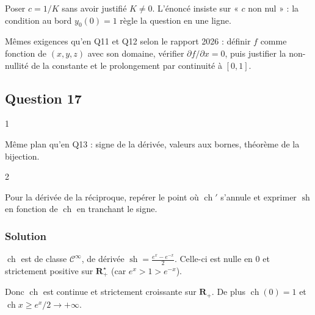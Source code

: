 \documentclass[11pt,a4paper]{article}
\begin{document}
\begin{piege}

Poser \(c=1/K\) sans avoir justifié \(K\ne0\). L'énoncé insiste sur « \(c\) non nul » : la condition au bord \(y_0(0)=1\) règle la question en une ligne.

\end{piege}

\begin{jury}

Mêmes exigences qu'en Q11 et Q12 selon le rapport 2026 : définir \(f\) comme fonction de \((x,y,z)\) avec son domaine, vérifier \(\partial f/\partial x=0\), puis justifier la non-nullité de la constante et le prolongement par continuité à \([0,1]\).

\end{jury}

\hypertarget{question-17}{%
\subsection{Question 17}\label{question-17}}

\begin{indication}{1}

Même plan qu'en Q13 : signe de la dérivée, valeurs aux bornes, théorème de la bijection.

\end{indication}

\begin{indication}{2}

Pour la dérivée de la réciproque, repérer le point où \(\operatorname{ch}'\) s'annule et exprimer \(\operatorname{sh}\) en fonction de \(\operatorname{ch}\) en tranchant le signe.

\end{indication}

\hypertarget{solution-16}{%
\subsubsection{Solution}\label{solution-16}}

\(\operatorname{ch}\) est de classe \(\mathcal C^\infty\), de dérivée \(\operatorname{sh}=\frac{e^x-e^{-x}}2\). Celle-ci est nulle en \(0\) et strictement positive sur \(\mathbf R_+^\star\) (car \(e^x>1>e^{-x}\)).

Donc \(\operatorname{ch}\) est continue et strictement croissante sur \(\mathbf R_+\). De plus \(\operatorname{ch}(0)=1\) et \(\operatorname{ch}x\ge e^x/2\to+\infty\).
\end{document}
